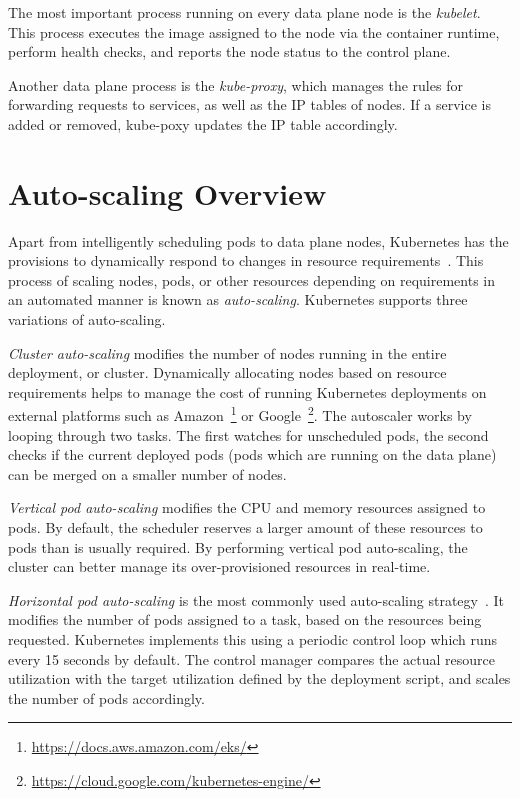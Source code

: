 The most important process running on every data plane node is the \textit{kubelet}. This process executes the image assigned to the node via the container runtime, perform health checks, and reports the node status to the control plane.\par

Another data plane process is the \textit{kube-proxy}, which manages the rules for forwarding requests to services, as well as the IP tables of nodes. If a service is added or removed, kube-poxy updates the IP table accordingly.\par

\section{Auto-scaling Overview}
\label{sec:ch2-auto-scaling}

Apart from intelligently scheduling pods to data plane nodes, Kubernetes has the provisions to dynamically respond to changes in resource requirements~\cite{kayal2020kubernetes}. This process of scaling nodes, pods, or other resources depending on requirements in an automated manner is known as \textit{auto-scaling}. Kubernetes supports three variations of auto-scaling.\par

\textit{Cluster auto-scaling} modifies the number of nodes running in the entire deployment, or cluster. Dynamically allocating nodes based on resource requirements helps to manage the cost of running Kubernetes deployments on external platforms such as Amazon~\footnote{\url{https://docs.aws.amazon.com/eks/}} or Google~\footnote{\url{https://cloud.google.com/kubernetes-engine/}}. The autoscaler works by looping through two tasks. The first watches for unscheduled pods, the second checks if the current deployed pods (pods which are running on the data plane) can be merged on a smaller number of nodes.\par

\textit{Vertical pod auto-scaling} modifies the CPU and memory resources assigned to pods. By default, the scheduler reserves a larger amount of these resources to pods than is usually required. By performing vertical pod auto-scaling, the cluster can better manage its over-provisioned resources in real-time.\par

\textit{Horizontal pod auto-scaling} is the most commonly used auto-scaling strategy~\cite{baresi2021kosmos}. It modifies the number of pods assigned to a task, based on the resources being requested. Kubernetes implements this using a periodic control loop which runs every 15 seconds by default. The control manager compares the actual resource utilization with the target utilization defined by the deployment script, and scales the number of pods accordingly.

